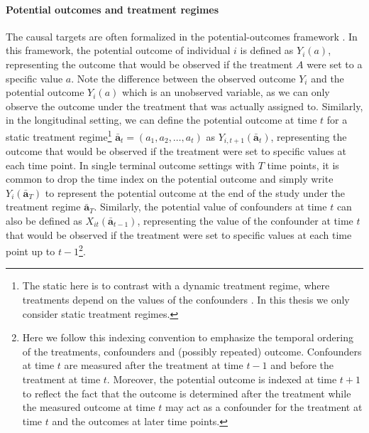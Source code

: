 \paragraph{Potential outcomes and treatment regimes}
The causal targets are often formalized in the potential-outcomes framework \cite{rubinEstimatingCausalEffects1974}. 
In this framework, the potential outcome of individual $i$ is defined as $Y_i(a)$, representing the outcome that would be observed if 
the treatment $A$ were set to a specific value $a$. Note the difference between the observed outcome $Y_i$ and the 
potential outcome $Y_i(a)$ which is an unobserved variable, 
as we can only observe the outcome under the treatment that was actually assigned to. Similarly, in the longitudinal setting, we can define the potential outcome at time $t$ for a 
static treatment regime\footnote{The static here is to contrast with a 
dynamic treatment regime, where treatments depend on the values of the confounders \cite{moodieDemystifyingOptimalDynamic2007}. In this thesis we only consider static treatment regimes.} 
$\bar{\mathbf{a}}_t = (a_1, a_2, \ldots, a_t)$ as $Y_{i,t+1}(\bar{\mathbf{a}}_t)$, 
representing the outcome that would be observed if the treatment were set to specific values at each 
time point. In single terminal outcome settings with $T$ time points, it is 
common to drop the time index on the potential outcome and simply 
write $Y_i(\bar{\mathbf{a}}_T)$ to represent the potential outcome at 
the end of the study under the treatment regime $\bar{\mathbf{a}}_T$. 
Similarly, the 
potential value of confounders at time $t$ can also be defined as $X_{it}(\bar{\mathbf{a}}_{t-1})$, 
representing the value of the confounder at time $t$ that would be observed if the treatment 
were set to specific values at each time point up to $t-1$\footnote{Here we follow this indexing convention to emphasize the temporal ordering of the treatments, 
confounders and (possibly repeated) outcome. Confounders at time $t$ are measured after the treatment at time $t-1$ 
and before the treatment at time $t$. Moreover, the potential outcome is indexed at time $t+1$ to reflect 
the fact that the outcome is determined after the treatment while the measured outcome at time $t$ may act 
as a confounder for the treatment at time $t$ and the outcomes at later time points.}.

